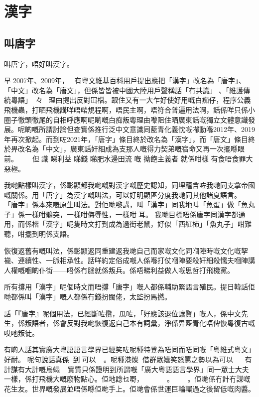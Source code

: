 \chapter{漢字}


\section{叫唐字}
叫唐字，唔好叫漢字。

早󱪙2007年、2009年，有粵文維基百科用戶提出應把「漢字」改名為「唐字」、「中文」改名為「唐文」，但係皆皆被中國大陸用戶聲稱話「冇共識」、「維護傳統粵語」々󱝚理由提出反對冚檔。跟住又有一大乍好使好用嘅白痴仔，程序公義飛機蟲，打晒飛機講咩唔啱規程啊，唔民主啊，唔符合普遍用法啊，話係咩只係小圈子徹頭徹尾的自相呼應啊呢啲嘅白痴叛粵理由嚟阻住晒廣東話嘅獨立文體意識發展。呢啲嘅所謂討論但查實係推行泛中文意識同藍青化義忱嘅喐動喺2012年、2019年再次掀起。而到咗2021年，「唐字」條目終於改名為「漢字」，而「唐文」條目終於畀改名為「中文」，廣東話奸細成為支那人嘅得力契弟嘅宿命又再一次擺喺眼前。 󱆶 但𠄡識 睇利益 睇錢 睇肥水邊田流 嘅 拗飽主義者 就係咁樣 有食唔食罪大惡極。


我哋點樣叫漢字，係彰顯都我哋嘅對漢字嘅歷史認知，同埋蘊含咗我哋同支拿帝國嘅關係。用「唐字」為漢字嘅叫法，可以好明顯區分度我哋同其他諸夏語言。
「唐字」係本來嘅原生叫法。對佢哋嚟講，叫「漢字」同我地叫「魚蛋」做「魚丸子」係一樣咁鶻突，一樣咁侮辱性，一樣咁耳。 我哋目標唔係唐字同漢字都通用，而係楷「漢字」呢隻時文打到成為過街老鼠，好似「西紅柿」「魚丸子」咁難聽，咁擺到明係支語。

恢復返舊有嘅叫法，係彰顯返同重建返我哋自己而家嘅文化同嗰陣時嘅文化嘅挐褦、連續性、一脈相承性。話咩約定俗成嘅人係喺打仗嗰陣要殺奸細殺懦夫嗰陣講人權嘅嗰啲仆街——唔係冇腦就係叛兵。係唔睇利益做人嘅思哲打飛機黨。

所有撐用「漢字」呢個時文而唔撐「唐字」嘅人都係輔助緊語言殖民。提日韓話佢哋都係叫「漢字」嘅人都係冇錢扮闊佬，太監扮馬撚。

話「『唐字』呢個用法，已經斷咗攬，瓜咗，「好應該退位讓賢」嘅人，係中文先生，係叛語者，係會反對我哋恢復返自己本有詞彙，淨係畀藍青化唔俾恢粵復古嘅哎吔叛徒。

有啲人話其實廣大粵語語言學界已經笑咗呢種特登為唔同而唔同嘅「粵維式粵文」好耐。 呢句說話真係到𠄡可以󱃪。呢種港燦借群眾嬉笑怒罵之勢以為可以有計謀有大計嘅烏蠅，實質只係證明到所謂嘅「廣大粵語語言學界」同一眾士大夫一樣，係打飛機大嘅廢物點心。佢地諗乜嘢，？。。佢哋係冇計冇謀嘅花生友。世界嘅發展並唔係喺佢哋手上。佢哋會係世運巨輪輾過之後留低嘅肉醬。

